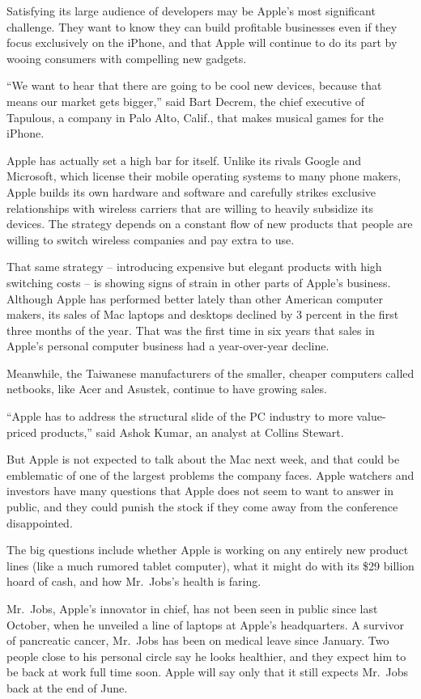 \documentclass[12pt,a4paper,onecolumn]{article}
\begin{document}
Satisfying its large audience of developers may be Apple's most significant challenge. They want to
know they can build profitable businesses even if they focus exclusively on the iPhone, and that
Apple will continue to do its part by wooing consumers with compelling new gadgets.

``We want to hear that there are going to be cool new devices, because that means our market gets
bigger,'' said Bart Decrem, the chief executive of Tapulous, a company in Palo Alto, Calif., that
makes musical games for the iPhone.

Apple has actually set a high bar for itself. Unlike its rivals Google and Microsoft, which license
their mobile operating systems to many phone makers, Apple builds its own hardware and software and
carefully strikes exclusive relationships with wireless carriers that are willing to heavily
subsidize its devices. The strategy depends on a constant flow of new products that people are
willing to switch wireless companies and pay extra to use.

That same strategy -- introducing expensive but elegant products with high switching costs -- is
showing signs of strain in other parts of Apple's business. Although Apple has performed better
lately than other American computer makers, its sales of Mac laptops and desktops declined by 3
percent in the first three months of the year. That was the first time in six years that sales in
Apple's personal computer business had a year-over-year decline.

Meanwhile, the Taiwanese manufacturers of the smaller, cheaper computers called netbooks, like Acer
and Asustek, continue to have growing sales.

``Apple has to address the structural slide of the PC industry to more value-priced products,'' said
Ashok Kumar, an analyst at Collins Stewart.

But Apple is not expected to talk about the Mac next week, and that could be emblematic of one of
the largest problems the company faces. Apple watchers and investors have many questions that Apple
does not seem to want to answer in public, and they could punish the stock if they come away from
the conference disappointed.

The big questions include whether Apple is working on any entirely new product lines (like a much
rumored tablet computer), what it might do with its \$29 billion hoard of cash, and how Mr.~Jobs's
health is faring.

Mr.~Jobs, Apple's innovator in chief, has not been seen in public since last October, when he
unveiled a line of laptops at Apple's headquarters. A survivor of pancreatic cancer, Mr.~Jobs has
been on medical leave since January. Two people close to his personal circle say he looks healthier,
and they expect him to be back at work full time soon. Apple will say only that it still expects
Mr.~Jobs back at the end of June.
\end{document}

